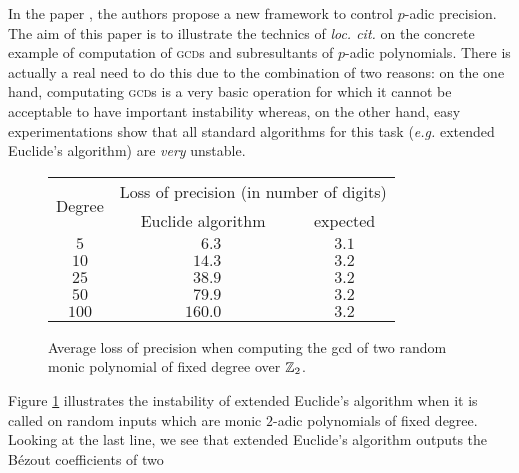 \documentclass{sig-alternate}
\begin{document}
In the paper \cite{padicprec}, the authors propose a new framework to control 
$p$-adic precision. The aim of this paper is to illustrate the technics 
of \emph{loc. cit.} on the concrete example of computation of 
\textsc{gcd}s and subresultants of $p$-adic polynomials. There is 
actually a real need to do this due to the combination of two reasons: on 
the one hand, computating \textsc{gcd}s is a very basic operation for 
which it cannot be acceptable to have important instability whereas, on 
the other hand, easy experimentations show that all standard algorithms 
for this task (\emph{e.g.} extended Euclide's algorithm) are \emph{very} 
unstable.
%
\begin{figure}
\renewcommand{\arraystretch}{1.2}
\begin{center}
\begin{tabular}{|c||c|c|}
\hline
\multirow{2}{*}{\hspace{0.2cm}Degree\hspace{0.2cm}\null} & 
\multicolumn{2}{c|}{\hspace{0.3cm}Loss of precision (in number of digits)\hspace{0.3cm}\null}\\
\cline{2-3}
& \hspace{0.3cm}Euclide algorithm\hspace{0.3cm}\null & expected \\
\hline
$5$ & $\phantom{00}6.3$ & $3.1$ \\
$10$ & $\phantom{0}14.3$ & $3.2$ \\
$25$ & $\phantom{0}38.9$ & $3.2$ \\
$50$ & $\phantom{0}79.9$ & $3.2$ \\
$100$ & $160.0$ & $3.2$ \\
\hline
\end{tabular}
\end{center}

\vspace{-0.3cm}

\caption{Average loss of precision when computing the {\sc gcd}
of two random monic polynomial of fixed degree over $\mathbb Z_2$.}
\label{fig:precision}

\vspace{-0.3cm}
\end{figure}
%
Figure \ref{fig:precision} illustrates the instability of extended Euclide's 
algorithm when it is called on random inputs which are monic $2$-adic 
polynomials of fixed degree. Looking at the last line, we see that 
extended Euclide's algorithm outputs the B\'ezout coefficients of two 
\end{document}
